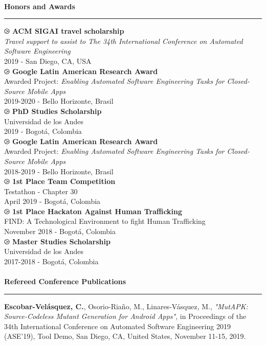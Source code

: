 \documentclass[letterpaper,11pt,oneside]{article}
\begin{document}
\\
\noindent \Large{\textbf{Honors and Awards}} \\
\vspace{-2ex}
\hrule 
\normalsize
\vspace{2ex}
\noindent $\ogreaterthan$ \textbf{ACM SIGAI travel scholarship} \\
\textit{Travel support to assist to The 34th International Conference on Automated Software Engineering }\\
2019 - San Diego, CA, USA \\
\noindent $\ogreaterthan$ \textbf{Google Latin American Research Award} \\
Awarded Project: \textit{Enabling Automated Software Engineering Tasks for Closed-Source Mobile Apps}\\
2019-2020 - Bello Horizonte, Brasil \\
\noindent $\ogreaterthan$ \textbf{PhD Studies Scholarship} \\
Universidad de los Andes\\
2019 - Bogotá, Colombia \\
\noindent $\ogreaterthan$ \textbf{Google Latin American Research Award} \\
Awarded Project: \textit{Enabling Automated Software Engineering Tasks for Closed-Source Mobile Apps}\\
2018-2019 - Bello Horizonte, Brasil \\
\noindent $\ogreaterthan$ \textbf{1st Place Team Competition} \\
Testathon - Chapter 30\\
April 2019 - Bogotá, Colombia \\
\noindent $\ogreaterthan$ \textbf{1st Place Hackaton Against Human Trafficking} \\
FIND: A Technological Environment to fight Human Trafficking\\
November 2018 - Bogotá, Colombia \\
\noindent $\ogreaterthan$ \textbf{Master Studies Scholarship} \\
Universidad de los Andes\\
2017-2018 - Bogotá, Colombia \\
\\
\noindent \Large{\textbf{Refereed Conference Publications}} \\
\vspace{-2ex}
\hrule 
\normalsize
\vspace{2ex}
\noindent [c3] \textbf{Escobar-Velásquez, C.}, Osorio-Riaño, M., Linares-Vásquez, M., \textit{"MutAPK: Source-Codeless Mutant Generation for Android Apps"}, in Proceedings of the 34th International Conference on Automated Software Engineering 2019 (ASE’19), Tool Demo, San Diego, CA, United States, November 11-15, 2019. \\
\end{document}

